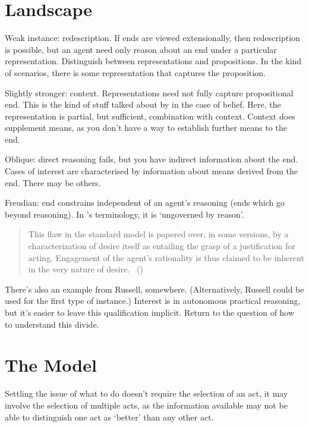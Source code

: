 \documentclass[10pt]{article}
\begin{document}
\newpage

\section{Landscape}
\label{sec:landscape}

Weak instance: redescription.
If ends are viewed extensionally, then redescription is possible, but an agent need only reason about an end under a particular representation.
Distinguish between representations and propositions.
In the kind of scenarios, there is some representation that captures the proposition.

Slightly stronger: context.
Representations need not fully capture propositional end.
This is the kind of stuff talked about by \citeauthor{Perry:1986aa} in the case of belief.
Here, the representation is partial, but sufficient, combination with context.
Context does supplement means, as you don't have a way to establish further means to the end.

Oblique: direct reasoning fails, but you have indirect information about the end.
Cases of interest are characterised by information about means derived from the end.
There may be others.

Freudian: end constrains independent of an agent's reasoning (ends which go beyond reasoning).
In \citeauthor{Velleman:2000ab}'s terminology, it is `ungoverned by reason'.
\begin{quote}
  This flaw in the standard model is papered over, in some versions, by a characterization of desire itself as entailing the grasp of a justification for acting.
  Engagement of the agent’s rationality is thus claimed to be inherent in the very nature of desire.\nolinebreak
  \mbox{ }\hfill(\cite[9]{Velleman:2000ab})
\end{quote}
There's also an example from Russell, somewhere.
(Alternatively, Russell could be used for the first type of instance.)
Interest is in autonomous practical reasoning, but it's easier to leave this qualification implicit.
Return to the question of how to understand this divide.

\newpage


\section{The Model}
\label{sec:model}

Settling the issue of what to do doesn't require the selection of an act, it may involve the selection of multiple acts, as the information available may not be able to distinguish one act as `better' than any other act.
\end{document}
